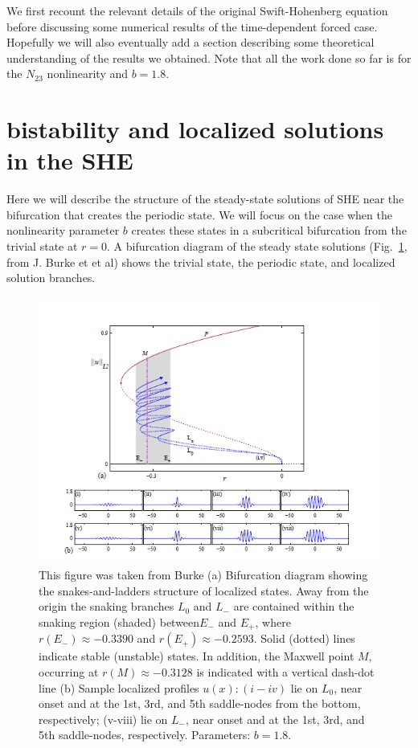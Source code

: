 \documentclass[pre,preprint,superscriptaddress]{revtex4-1}
\begin{document}
We first recount the relevant details of the original Swift-Hohenberg equation before discussing some numerical results of the time-dependent forced case.  Hopefully we will also eventually add a section describing some theoretical understanding of the results we obtained.  Note that all the work done so far is for the $N_{23}$ nonlinearity and $b=1.8$.


\section{bistability and localized solutions in the SHE}
Here we will describe the structure of the steady-state solutions of SHE near the bifurcation that creates the periodic state.  We will focus on the case when the nonlinearity parameter $b$ creates these states in a subcritical bifurcation from the trivial state at $r=0$.  A bifurcation diagram of the steady state solutions (Fig.~\ref{fig:BurkeSHE}, from J. Burke et et al) shows the trivial state, the periodic state, and localized solution branches.  

\begin{figure}[h]\center
\includegraphics[width=120mm]{BurkeSHE.PNG}
\caption{\label{fig:BurkeSHE}This figure was taken from Burke\cite{} (a) Bifurcation diagram showing the snakes-and-ladders structure of localized states. Away from the origin the snaking branches $L_0$ and $L_-$ are contained within the snaking region (shaded) between$E_-$ and $E_+$, where $r(E_-)\approx -0.3390$ and $r(E_+)\approx -0.2593$.   Solid (dotted) lines indicate stable (unstable) states. In addition, the Maxwell point $M$, occurring at $r(M)\approx -0.3128$  is indicated with a vertical dash-dot line (b) Sample localized profiles $u(x): (i-iv)$ lie on $L_0$, near onset and at the 1st, 3rd, and 5th saddle-nodes from the bottom, respectively; (v-viii) lie on $L_-$, near onset and at the 1st, 3rd, and 5th saddle-nodes, respectively. Parameters: $b = 1.8$.}
\end{figure}
\end{document}

